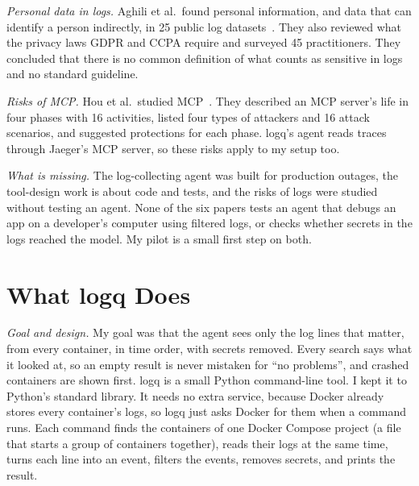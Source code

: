 \documentclass[10pt,conference]{IEEEtran}
\begin{document}
\emph{Personal data in logs.} Aghili et al.\ found personal information, and data that can identify a person indirectly, in 25 public log datasets~\cite{aghili2025logprivacy}. They also reviewed what the privacy laws GDPR and CCPA require and surveyed 45 practitioners. They concluded that there is no common definition of what counts as sensitive in logs and no standard guideline.

\emph{Risks of MCP.} Hou et al.\ studied MCP~\cite{hou2026mcp}. They described an MCP server's life in four phases with 16 activities, listed four types of attackers and 16 attack scenarios, and suggested protections for each phase. logq's agent reads traces through Jaeger's MCP server, so these risks apply to my setup too.

\emph{What is missing.} The log-collecting agent was built for production outages, the tool-design work is about code and tests, and the risks of logs were studied without testing an agent. None of the six papers tests an agent that debugs an app on a developer's computer using filtered logs, or checks whether secrets in the logs reached the model. My pilot is a small first step on both.

\section{What logq Does}\label{sec:approach}

\emph{Goal and design.} My goal was that the agent sees only the log lines that matter, from every container, in time order, with secrets removed. Every search says what it looked at, so an empty result is never mistaken for ``no problems'', and crashed containers are shown first. logq is a small Python command-line tool. I kept it to Python's standard library. It needs no extra service, because Docker already stores every container's logs, so logq just asks Docker for them when a command runs. Each command finds the containers of one Docker Compose project (a file that starts a group of containers together), reads their logs at the same time, turns each line into an event, filters the events, removes secrets, and prints the result.
\end{document}
